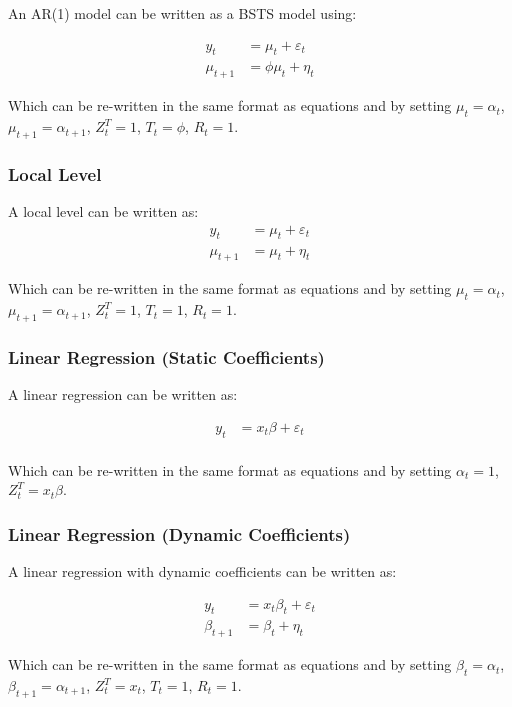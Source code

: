 \documentclass[12pt]{article}
\begin{document}
An AR(1) model  can be written as a BSTS model using:

\begin{align}
    y_t &= \mu_t + \varepsilon_t \\
    \mu_{t+1} &= \phi \mu_t + \eta_t
\end{align}

Which can be re-written in the same format as equations \label{eq} and \label{eq1} by setting $\mu_t = \alpha_t$, $\mu_{t+1} = \alpha_{t+1}$, $Z_t^T = 1$, $T_t = \phi$, $R_t = 1$.


\subsubsection{Local Level}
A local level  can be written as:
\begin{align}
    y_{t} &= \mu_t + \varepsilon_t \\
    \mu_{t+1} &= \mu_t + \eta_t 
    \end{align}

Which can be re-written in the same format as equations \label{eq} and \label{eq1} by setting $\mu_t = \alpha_t$, $\mu_{t+1} = \alpha_{t+1}$, $Z_t^T = 1$, $T_t = 1$, $R_t = 1$.

\subsubsection{Linear Regression (Static Coefficients)}\label{linreg}
A linear regression can be written as:

\begin{align}
    y_{t} &= x_t\beta + \varepsilon_t\\
\end{align}

Which can be re-written in the same format as equations \label{eq} and \label{eq1} by setting $\alpha_t=1$,  $Z_t^T = x_t\beta$.

\subsubsection{Linear Regression (Dynamic Coefficients)}
A linear regression with dynamic coefficients can be written as:

\begin{align}
    y_{t} &= x_t\beta_t + \varepsilon_t\\
    \beta_{t+1} &= \beta_t + \eta_t
\end{align}

Which can be re-written in the same format as equations \label{eq} and \label{eq1} by setting $\beta_t = \alpha_t$, $\beta_{t+1}=\alpha_{t+1}$, $Z_t^T = x_t$, $T_t = 1$, $R_t = 1$.\\
\end{document}
